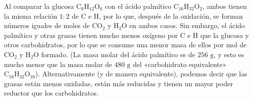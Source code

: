 \documentclass[12pt]{book}
\begin{document}
Al comparar la glucosa $\text{C}_6\text{H}_{12}\text{O}_6$ con el ácido palmítico $\text{C}_{16}\text{H}_{32}\text{O}_2$, ambos tienen la misma relación $1:2$ de $\text{C}$ e $\text{H}$, por lo que, después de la oxidación, se forman números iguales de moles de $\text{CO}_2$ y $\text{H}_2\text{O}$ en ambos casos. Sin embargo, el ácido palmítico y otras grasas tienen mucho menos oxígeno por $\text{C}$ e $\text{H}$ que la glucosa y otros carbohidratos, por lo que se consume una menor masa de ellos por mol de $\text{CO}_2$ y $\text{H}_2\text{O}$ formado. (La masa molar del ácido palmítico es de $256\text{ g}$, y esto es mucho menor que la masa molar de $480\text{ g}$ del «carbohidrato equivalente» $\text{C}_{16}\text{H}_{32}\text{O}_{16}$). Alternativamente (y de manera equivalente), podemos decir que las grasas están menos oxidadas, están más reducidas y tienen un mayor poder reductor que los carbohidratos.
\end{document}
